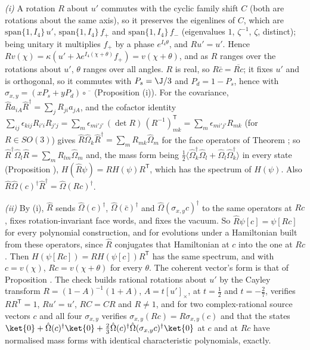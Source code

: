 \emph{(i)} A rotation $R$ about $u'$ commutes with the cyclic family shift $C$ (both are rotations about the same axis), so it preserves the eigenlines of $C$, which are $\mathrm{span}\{1, I_4\}\,u'$, $\mathrm{span}\{1, I_4\}\,f_{+}$ and $\mathrm{span}\{1, I_4\}\,f_{-}$ (eigenvalues $1$, $\zeta^{-1}$, $\zeta$, distinct); being unitary it multiplies $f_{+}$ by a phase $e^{I_4\theta}$, and $Ru' = u'$. Hence $Rv(\chi) = \kappa(u' + \lambda e^{I_4(\chi + \theta)}f_{+}) = v(\chi + \theta)$, and as $R$ ranges over the rotations about $u'$, $\theta$ ranges over all angles. $R$ is real, so $R\bar{c} = \overline{Rc}$; it fixes $u'$ and is orthogonal, so it commutes with $P_{s} = \J/3$ and $P_{d} = 1 - P_{s}$, hence with $\sigma_{x,y} = (xP_{s} + yP_{d}) \circ \overline{\phantom{v}}$ (Proposition (i)). For the covariance, $\hat{R}a_{iA}\hat{R}^{\dagger} = \sum_{j}R_{ji}a_{jA}$, and the cofactor identity $\sum_{ij}\epsilon_{kij}R_{i'i}R_{j'j} = \sum_{m}\epsilon_{mi'j'}\,(\det R)\,(R^{-1})^{\mathsf{T}}_{mk} = \sum_{m}\epsilon_{mi'j'}R_{mk}$ (for $R \in SO(3)$) gives $\hat{R}\hat\Omega_{k}\hat{R}^{\dagger} = \sum_{m}R_{mk}\hat\Omega_{m}$ for the face operators of Theorem ; so $\hat{R}^{\dagger}\hat\Omega_{l}\hat{R} = \sum_{m}R_{lm}\hat\Omega_{m}$ and, the mass form being $\tfrac12\langle\hat\Omega_{k}^{\dagger}\hat\Omega_{l} + \hat\Omega_{l}\hat\Omega_{k}^{\dagger}\rangle$ in every state (Proposition ), $H(\hat{R}\psi) = RH(\psi)R^{\mathsf{T}}$, which has the spectrum of $H(\psi)$. Also $\hat{R}\hat\Omega(c)^{\dagger}\hat{R}^{\dagger} = \hat\Omega(Rc)^{\dagger}$.

\emph{(ii)} By (i), $\hat{R}$ sends $\hat\Omega(c)^{\dagger}$, $\hat\Omega(\bar{c})^{\dagger}$ and $\hat\Omega(\sigma_{x,y}c)^{\dagger}$ to the same operators at $Rc$, fixes rotation-invariant face words, and fixes the vacuum. So $\hat{R}\psi[c] = \psi[Rc]$ for every polynomial construction, and for evolutions under a Hamiltonian built from these operators, since $\hat{R}$ conjugates that Hamiltonian at $c$ into the one at $Rc$. Then $H(\psi[Rc]) = RH(\psi[c])R^{\mathsf{T}}$ has the same spectrum, and with $c = v(\chi)$, $Rc = v(\chi + \theta)$ for every $\theta$. The coherent vector's form is that of Proposition . The check builds rational rotations about $u'$ by the Cayley transform $R = (1 - A)^{-1}(1 + A)$, $A = t[u']_{\times}$, at $t = \tfrac12$ and $t = -\tfrac27$, verifies $RR^{\mathsf{T}} = 1$, $Ru' = u'$, $RC = CR$ and $R \neq 1$, and for two complex-rational source vectors $c$ and all four $\sigma_{x,y}$ verifies $\sigma_{x,y}(Rc) = R\sigma_{x,y}(c)$ and that the states $\ket{0} + \hat\Omega(c)^{\dagger}\ket{0} + \tfrac23\hat\Omega(c)^{\dagger}\hat\Omega(\sigma_{x,y}c)^{\dagger}\ket{0}$ at $c$ and at $Rc$ have normalised mass forms with identical characteristic polynomials, exactly.

